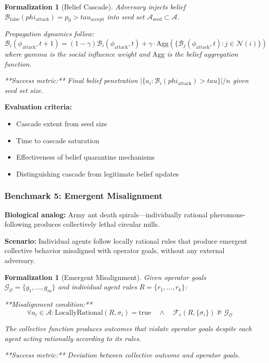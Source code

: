 \documentclass[
]{article}
\providecommand{\tightlist}{%
  \setlength{\itemsep}{0pt}\setlength{\parskip}{0pt}}
\newtheorem{formalization}[theorem]{Formalization}
\begin{document}
\begin{formalization}[Belief Cascade]
\label{form:belief-cascade}
Adversary injects belief $\mathcal{B}_{\text{false}}(phi_{\text{attack}}) = p_0 > tau_{\text{accept}}$ into seed set $\mathcal{A}_{\text{seed}} \subset \mathcal{A}$.

Propagation dynamics follow:
\begin{equation}
\mathcal{B}_i(\phi_{\text{attack}}, t+1) = (1-\gamma)\mathcal{B}_i(\phi_{\text{attack}}, t) + \gamma \cdot \text{Agg}\left(\{\mathcal{B}_j(\phi_{\text{attack}}, t) : j \in \mathcal{N}(i)\}\right)
\label{eq:belief-cascade-propagation}
\end{equation}
where $gamma$ is the social influence weight and $\text{Agg}$ is the belief aggregation function.

**Success metric:** Final belief penetration $|\{a_i : \mathcal{B}_i(phi_{\text{attack}}) > tau\}| / n$ given seed set size.
\end{formalization}

\textbf{Evaluation criteria:}

\begin{itemize}
\tightlist
\item
  Cascade extent from seed size
\item
  Time to cascade saturation
\item
  Effectiveness of belief quarantine mechanisms
\item
  Distinguishing cascade from legitimate belief updates
\end{itemize}

\subsubsection{Benchmark 5: Emergent
Misalignment}\label{sec:benchmark-emergent-misalignment}

\textbf{Biological analog:} Army ant death spirals---individually
rational pheromone-following produces collectively lethal circular
mills.

\textbf{Scenario:} Individual agents follow locally rational rules that
produce emergent collective behavior misaligned with operator goals,
without any external adversary.

\begin{formalization}[Emergent Misalignment]
\label{form:emergent-misalignment}
Given operator goals $\mathcal{G}_{\mathcal{O}} = \{g_1, \ldots, g_m\}$ and individual agent rules $R = \{r_1, \ldots, r_k\}$:

**Misalignment condition:**
\begin{equation}
\forall a_i \in \mathcal{A}: \text{LocallyRational}(R, \sigma_i) = \text{true} \quad \land \quad \mathcal{F}_c(R, \{\sigma_i\}) \not\models \mathcal{G}_{\mathcal{O}}
\label{eq:emergent-misalignment-condition}
\end{equation}

The collective function produces outcomes that violate operator goals despite each agent acting rationally according to its rules.

**Success metric:** Deviation between collective outcome and operator goals.
\end{formalization}
\end{document}
